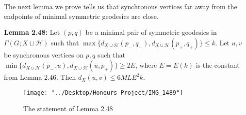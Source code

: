 \documentclass[12pt]{article}
\newcommand{\vs}{\vskip10pt}
\begin{document}
	The next lemma we prove tells us that synchronous vertices far away from the endpoints of minimal symmetric geodesics are close. 
	
	\vs 
	
	\textbf{Lemma 2.48: } Let $(p,q)$ be a minimal pair of symmetric geodesics in $\Gamma(G; X \sqcup \mathcal{H})$ such that
	\vskip1pt$\max\{d_{X \cup \mathcal{H}}(p_{-}, q_{-}), d_{X \cup \mathcal{H}}(p_{+}, q_{+})\} \leq k$. Let $u,v$ be synchronous vertices on $p,q$ such that \vskip1pt$\min \{d_{X \cup \mathcal{H}}(p_{-}, u), d_{X \cup \mathcal{H}}(u, p_{+})\} \geq 2 E$, where $E = E(k)$ is the constant from Lemma 2.46. Then $d_X(u,v) \leq 6 ML E^2 k$. 
	
\begin{figure} [H]
	\centering
	\texttt{[image: "../Desktop/Honours Project/IMG\_1489"]}
	\caption{The statement of Lemma 2.48}
	\label{fig:img1489}
\end{figure}
	
\end{document}
